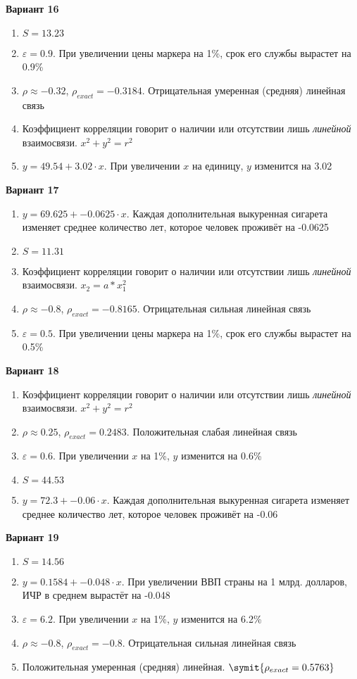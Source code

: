 \documentclass{article}
\begin{document}
\textbf{Вариант 16}
\begin{enumerate}
\item $S = 13.23$
\item $\varepsilon = 0.9$. При увеличении цены маркера на 1\%, срок его службы вырастет на 0.9\%
\item $\rho \approx -0.32$, $\rho_{exact} = -0.3184$. Отрицательная умеренная (средняя) линейная связь
\item Коэффициент корреляции говорит о наличии или отсутствии лишь \textit{линейной} взаимосвязи. $x ^ 2 + y ^ 2 = r^2$
\item $y = 49.54+3.02\cdot x$. При увеличении $x$ на единицу, $y$ изменится на 3.02
\end{enumerate}

\textbf{Вариант 17}
\begin{enumerate}
\item $y = 69.625+-0.0625\cdot x$. Каждая дополнительная выкуренная сигарета изменяет среднее количество лет, которое человек проживёт на -0.0625
\item $S = 11.31$
\item Коэффициент корреляции говорит о наличии или отсутствии лишь \textit{линейной} взаимосвязи. $x_2 = a * x_1 ^ 2$  
\item $\rho \approx -0.8$, $\rho_{exact} = -0.8165$. Отрицательная сильная линейная связь
\item $\varepsilon = 0.5$. При увеличении цены маркера на 1\%, срок его службы вырастет на 0.5\%
\end{enumerate}

\textbf{Вариант 18}
\begin{enumerate}
\item Коэффициент корреляции говорит о наличии или отсутствии лишь \textit{линейной} взаимосвязи. $x ^ 2 + y ^ 2 = r^2$
\item $\rho \approx 0.25$, $\rho_{exact} = 0.2483$. Положительная слабая линейная связь
\item $\varepsilon = 0.6$. При увеличении $x$ на 1\%, $y$ изменится на 0.6\%
\item $S = 44.53$
\item $y = 72.3+-0.06\cdot x$. Каждая дополнительная выкуренная сигарета изменяет среднее количество лет, которое человек проживёт на -0.06
\end{enumerate}

\textbf{Вариант 19}
\begin{enumerate}
\item $S = 14.56$
\item $y = 0.1584 + -0.048\cdot x$. При увеличении ВВП страны на 1 млрд. долларов, ИЧР в среднем вырастёт на -0.048
\item $\varepsilon = 6.2$. При увеличении $x$ на 1\%, $y$ изменится на 6.2\%
\item $\rho \approx -0.8$, $\rho_{exact} = -0.8$. Отрицательная сильная линейная связь
\item Положительная умеренная (средняя) линейная. $\symit{\rho_{exact} = 0.5763}$
\end{enumerate}
\end{document}
